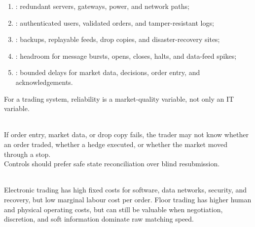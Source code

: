 \begin{taxonomy} 
\begin{enumerate}[label=\roman*.]
\setlength{\itemsep}{0pt}
\item {}: redundant servers, gateways, power, and network paths;
\item {}: authenticated users, validated orders, and tamper-resistant logs;
\item {}: backups, replayable feeds, drop copies, and disaster-recovery sites;
\item {}: headroom for message bursts, opens, closes, halts, and data-feed spikes;
\item {}: bounded delays for market data, decisions, order entry, and acknowledgements.
\end{enumerate}
For a trading system, reliability is a market-quality variable, not only an IT variable.
\end{taxonomy}

\begin{caveat} \\
If order entry, market data, or drop copy fails, the trader may not know whether an order traded, whether a hedge executed, or whether the market moved through a stop.\\
Controls should prefer safe state reconciliation over blind resubmission.
\end{caveat}

\begin{mechanism} \\
Electronic trading has high fixed costs for software, data networks, security, and recovery, but low marginal labour cost per order. Floor trading has higher human and physical operating costs, but can still be valuable when negotiation, discretion, and soft information dominate raw matching speed.
\end{mechanism}
